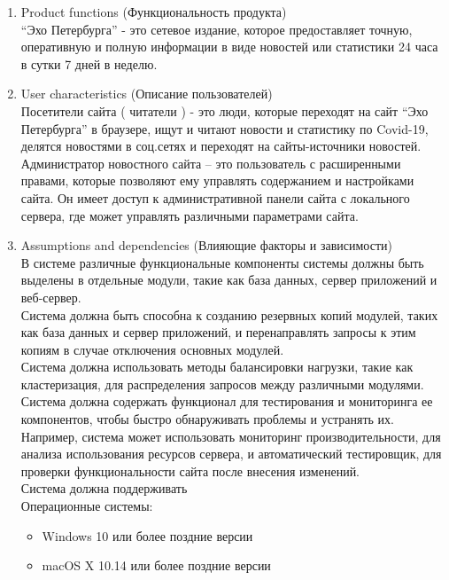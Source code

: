 \begin{enumerate}
    \begin{enumerate}[label=2.\arabic*]
        \item Product functions (Функциональность продукта) \\
        ``Эхо Петербурга'' - это сетевое издание, которое предоставляет точную, оперативную и полную информации в
        виде новостей или статистики 24 часа в сутки 7 дней в неделю.
        \item User characteristics (Описание пользователей) \\
        Посетители сайта ( читатели ) - это люди, которые переходят на сайт ``Эхо Петербурга'' в браузере, ищут и
        читают новости и статистику по Covid-19, делятся новостями в соц.сетях и переходят на сайты-источники новостей. \\
        Администратор новостного сайта – это пользователь с расширенными правами, которые позволяют ему управлять содержанием и настройками сайта.
        Он имеет доступ к административной панели сайта с локального сервера, где может управлять различными параметрами сайта.
        \item Assumptions and dependencies (Влияющие факторы и зависимости) \\
        В системе различные функциональные компоненты системы должны быть выделены в отдельные модули, такие как база
        данных, сервер приложений и веб-сервер. \\
        Система должна быть способна к созданию резервных копий модулей, таких как база данных и сервер приложений, и
        перенаправлять запросы к этим копиям в случае отключения основных модулей. \\
        Система должна использовать методы балансировки нагрузки, такие как кластеризация, для распределения запросов
        между различными модулями. \\
        Система должна содержать функционал для тестирования и мониторинга ее компонентов, чтобы быстро обнаруживать
        проблемы и устранять их. Например, система может использовать мониторинг производительности, для анализа
        использования ресурсов сервера, и автоматический тестировщик, для проверки функциональности сайта после внесения изменений. \\
        Система должна поддерживать \\
        \quad Операционные системы:
        \begin{itemize}
            \item Windows 10 или более поздние версии
            \item macOS X 10.14 или более поздние версии

\end{itemize}
\end{enumerate}
\end{enumerate}
